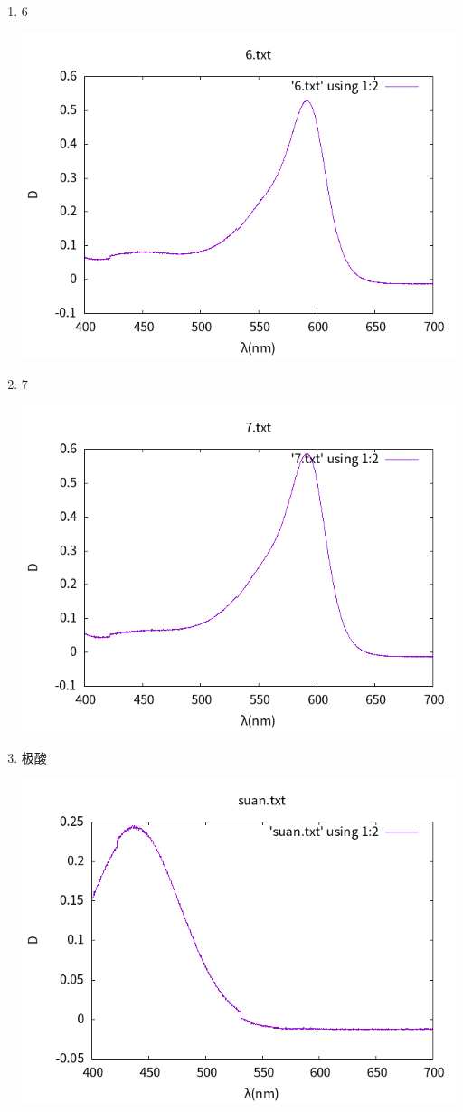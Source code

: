 \documentclass[11pt]{report}
\begin{document}
\begin{enumerate}
\begin{center}
\end{center}
\item 6
\label{sec:org3eb314f}
\begin{center}
\includegraphics[width=.9\linewidth]{../img/6.txt.png}
\end{center}
\item 7
\label{sec:orgc1a17d4}
\begin{center}
\includegraphics[width=.9\linewidth]{../img/7.txt.png}
\end{center}
\item 极酸
\label{sec:org802b35a}
\begin{center}
\includegraphics[width=.9\linewidth]{../img/suan.txt.png}

\end{center}
\end{enumerate}
\end{document}

